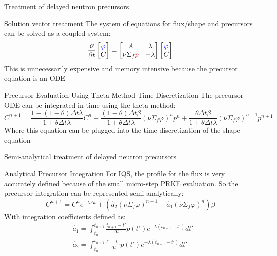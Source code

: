 \documentclass[8pt,xcolor=dvipnames]{beamer}
\newcommand{\be}{\begin{equation*}}
\newcommand{\ee}{\end{equation*}}
\newcommand{\tcr}[1]{\textcolor{red}{#1}}
\newcommand{\tcb}[1]{\textcolor{blue}{#1}}
\begin{document}
\begin{frame}{Treatment of delayed neutron precursors}

\begin{block}{Solution vector treatment}
The system of equations for flux/shape and precursors can be solved as a coupled system:
\be
\frac{\partial}{\partial t} \begin{bmatrix} \tcb{\varphi} \\ C \end{bmatrix}
=
\begin{bmatrix} A & \lambda \\ \nu\Sigma_f \tcr{p} & -\lambda \end{bmatrix}
\begin{bmatrix} \tcb{\varphi} \\ C \end{bmatrix}
\ee
This is unnecessarily expensive and memory intensive because the precursor equation is an ODE
\end{block}

\begin{block}{Precursor Evaluation Using Theta Method Time Discretization}
The precursor ODE can be integrated in time using the theta method:
\be
C^{n+1} = \frac{1-(1-\theta)\Delta t\lambda}{1+\theta\Delta t\lambda}C^n + \frac{(1-\theta)\Delta t \beta}{1+\theta\Delta t\lambda}(\nu\Sigma_f\varphi)^n p^n +  \frac{\theta\Delta t \beta}{1+\theta\Delta t\lambda}(\nu\Sigma_f\varphi)^{n+1} p^{n+1}
\ee
Where this equation can be plugged into the time discretization of the shape equation
\end{block}

\end{frame}

\begin{frame}{Semi-analytical treatment of delayed neutron precursors}

\begin{block}{Analytical Precursor Integration}
For IQS, the profile for the flux is very accurately defined because of the small micro-step PRKE evaluation. So the precursor integration can be represented semi-analytically:
\be
C^{n+1} = C^n e^{-\lambda \Delta t} + \left(\hat{a}_2 (\nu\Sigma_f\varphi)^{n+1}+\hat{a}_1 (\nu\Sigma_f\varphi)^n\right)\beta
\label{eq:dnp_an}
\ee
With integration coefficients defined as:
\begin{align*}
&\hat{a}_1= \int_{t_n}^{t_{n+1}}\frac{t_{n+1}-t'}{\Delta t}p(t')e^{-\lambda(t_{n+1}-t')}dt' \\
&\hat{a}_2 = \int_{t_n}^{t_{n+1}}\frac{t'-t_n}{\Delta t}p(t')e^{-\lambda(t_{n+1}-t')}dt'
\end{align*}
\end{block}

\end{frame}
\end{document}
